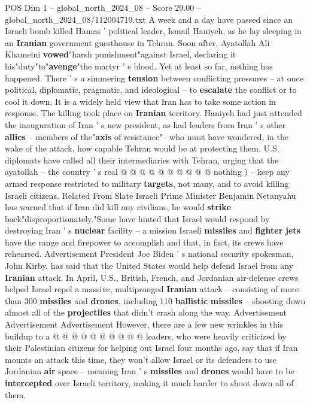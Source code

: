 \begin{textsample}{POS Dim 1 – global\_north\_2024\_08 – Score 29.00 – global\_north\_2024\_08/112004719.txt}  \label{ex:f1_pos_074}
A week and a day have passed since an Israeli bomb killed Hamas ' political leader, Ismail Haniyeh, as he lay sleeping in an \textbf{Iranian} government guesthouse in Tehran.
Soon after, Ayatollah Ali Khameini \textbf{vowed}"harsh punishment"against Israel, declaring it his"duty"to"\textbf{avenge}"the martyr ' s blood.
Yet at least so far, nothing has happened.
There ' s a simmering \textbf{tension} between conflicting pressures -- at once political, diplomatic, pragmatic, and ideological -- to \textbf{escalate} the conflict or to cool it down.
It is a widely held view that Iran has to take some action in response.
The killing took place on \textbf{Iranian} territory.
Haniyeh had just attended the inauguration of Iran ' s new president, as had leaders from Iran ' s other \textbf{allies} -- members of the"\textbf{axis} of resistance"-- who must have wondered, in the wake of the attack, how capable Tehran would be at protecting them.
U.S. diplomats have called all their intermediaries with Tehran, urging that the ayatollah -- the country ' s real @ @ @ @ @ @ @ @ @ @ nothing ) -- keep any armed response restricted to military \textbf{targets}, not many, and to avoid killing Israeli citizens.
Related From Slate Israeli Prime Minister Benjamin Netanyahu has warned that if Iran did kill any civilians, he would \textbf{strike} back"disproportionately."Some have hinted that Israel would respond by destroying Iran ' s \textbf{nuclear} facility -- a mission Israeli \textbf{missiles} and \textbf{fighter} \textbf{jets} have the range and firepower to accomplish and that, in fact, its crews have rehearsed.
Advertisement President Joe Biden ' s national security spokesman, John Kirby, has said that the United States would help defend Israel from any \textbf{Iranian} attack.
In April, U.S., British, French, and Jordanian air-defense crews helped Israel repel a massive, multipronged \textbf{Iranian} attack -- consisting of more than 300 \textbf{missiles} and \textbf{drones}, including 110 \textbf{ballistic} \textbf{missiles} -- shooting down almost all of the \textbf{projectiles} that didn't crash along the way.
Advertisement Advertisement Advertisement However, there are a few new wrinkles in this buildup to a @ @ @ @ @ @ @ @ @ @ leaders, who were heavily criticized by their Palestinian citizens for helping out Israel four months ago, say that if Iran mounts an attack this time, they won't allow Israel or its defenders to use Jordanian \textbf{air} space -- meaning Iran ' s \textbf{missiles} and \textbf{drones} would have to be \textbf{intercepted} over Israeli territory, making it much harder to shoot down all of them.

\end{textsample}
